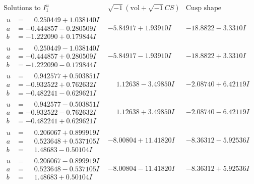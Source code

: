 \documentclass[1p]{elsarticle_modified}
\theoremstyle{definition}
\newcommand{\I}{\sqrt{-1}}
\begin{document}
$$\begin{array}{c|c|c}  
\text{Solutions to }I^u_{1}& \I (\text{vol} + \sqrt{-1}CS) & \text{Cusp shape}\\
 \hline 
\begin{aligned}
u &= \phantom{-}0.250449 + 1.038140 I \\
a &= -0.444857 - 0.280509 I \\
b &= -1.222090 + 0.179844 I\end{aligned}
 & -5.84917 + 1.93910 I & -18.8822 - 3.3310 I \\ \hline\begin{aligned}
u &= \phantom{-}0.250449 - 1.038140 I \\
a &= -0.444857 + 0.280509 I \\
b &= -1.222090 - 0.179844 I\end{aligned}
 & -5.84917 - 1.93910 I & -18.8822 + 3.3310 I \\ \hline\begin{aligned}
u &= \phantom{-}0.942577 + 0.503851 I \\
a &= -0.932522 + 0.762632 I \\
b &= -0.482241 - 0.629621 I\end{aligned}
 & \phantom{-}1.12638 - 3.49850 I & -2.08740 + 6.42119 I \\ \hline\begin{aligned}
u &= \phantom{-}0.942577 - 0.503851 I \\
a &= -0.932522 - 0.762632 I \\
b &= -0.482241 + 0.629621 I\end{aligned}
 & \phantom{-}1.12638 + 3.49850 I & -2.08740 - 6.42119 I \\ \hline\begin{aligned}
u &= \phantom{-}0.206067 + 0.899919 I \\
a &= \phantom{-}0.523648 + 0.537105 I \\
b &= \phantom{-}1.48683 - 0.50104 I\end{aligned}
 & -8.00804 + 11.41820 I & -8.36312 - 5.92536 I \\ \hline\begin{aligned}
u &= \phantom{-}0.206067 - 0.899919 I \\
a &= \phantom{-}0.523648 - 0.537105 I \\
b &= \phantom{-}1.48683 + 0.50104 I\end{aligned}
 & -8.00804 - 11.41820 I & -8.36312 + 5.92536 I \\ \hline\begin{aligned}

\end{aligned}
\end{array}$$
\end{document}
